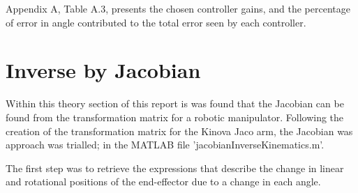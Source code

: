 \documentclass[12pt,openany,a4paper]{book}
\begin{document}


Appendix A, Table A.3, presents the chosen controller gains, and the percentage of error in angle contributed to the total error seen by each controller.

%
\clearpage

\section{Inverse by Jacobian}
Within this theory section of this report is was found that the Jacobian can be found from the transformation matrix for a robotic manipulator. Following the creation of the transformation matrix for the Kinova Jaco arm, the Jacobian was approach was trialled; in the MATLAB file 'jacobianInverseKinematics.m'.

The first step was to retrieve the expressions that describe the change in linear and rotational positions of the end-effector due to a change in each angle. 
\end{document}
